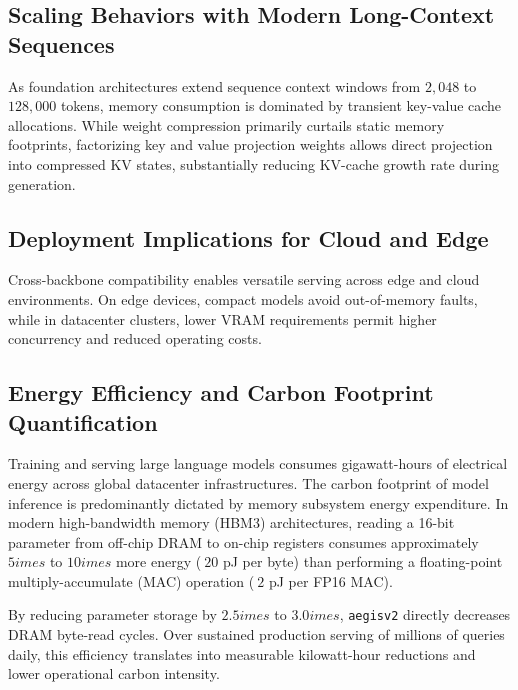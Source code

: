 \subsection{Scaling Behaviors with Modern Long-Context Sequences}
As foundation architectures extend sequence context windows from $2{,}048$ to $128{,}000$ tokens, memory consumption is dominated by transient key-value cache allocations. While weight compression primarily curtails static memory footprints, factorizing key and value projection weights allows direct projection into compressed KV states, substantially reducing KV-cache growth rate during generation.

\subsection{Deployment Implications for Cloud and Edge}
Cross-backbone compatibility enables versatile serving across edge and cloud environments. On edge devices, compact models avoid out-of-memory faults, while in datacenter clusters, lower VRAM requirements permit higher concurrency and reduced operating costs.

\subsection{Energy Efficiency and Carbon Footprint Quantification}
Training and serving large language models consumes gigawatt-hours of electrical energy across global datacenter infrastructures. The carbon footprint of model inference is predominantly dictated by memory subsystem energy expenditure. In modern high-bandwidth memory (HBM3) architectures, reading a 16-bit parameter from off-chip DRAM to on-chip registers consumes approximately $5	imes$ to $10	imes$ more energy ($~20$ pJ per byte) than performing a floating-point multiply-accumulate (MAC) operation ($~2$ pJ per FP16 MAC).

By reducing parameter storage by $2.5	imes$ to $3.0	imes$, \texttt{aegisv2} directly decreases DRAM byte-read cycles. Over sustained production serving of millions of queries daily, this efficiency translates into measurable kilowatt-hour reductions and lower operational carbon intensity.
